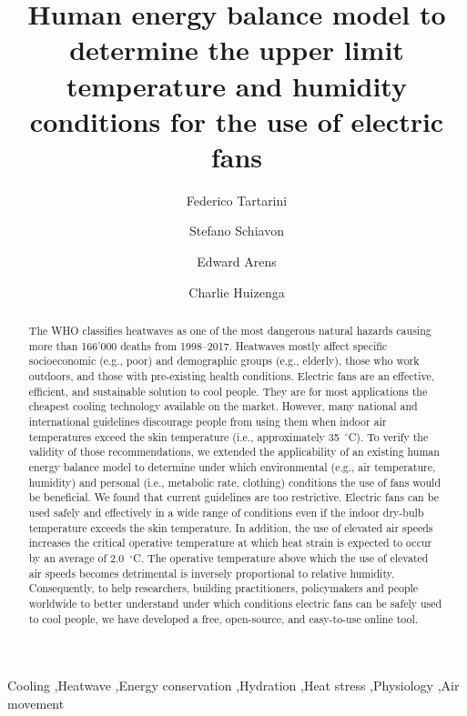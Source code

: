 
\begin{frontmatter}

\title{Human energy balance model to determine the upper limit temperature and humidity conditions for the use of electric fans}

\author[sinBerBest]{Federico Tartarini}
\author[CBE]{Stefano Schiavon}
\author[CBE]{Edward Arens}
\author[CBE]{Charlie Huizenga}

\address[sinBerBest]{SinBerBEST, Berkeley Education Alliance for Research in Singapore, Singapore}
\address[CBE]{Center for the Built Environment, University of California, Berkeley, USA}

\begin{abstract}
    The WHO classifies heatwaves as one of the most dangerous natural hazards causing more than 166'000 deaths from 1998--2017.
    Heatwaves mostly affect specific socioeconomic (e.g., poor) and demographic groups (e.g., elderly), those who work outdoors, and those with pre-existing health conditions.
    Electric fans are an effective, efficient, and sustainable solution to cool people.
    They are for most applications the cheapest cooling technology available on the market.
    However, many national and international guidelines discourage people from using them when indoor air temperatures exceed the skin temperature (i.e., approximately 35~$^{\circ}$C\@).
    To verify the validity of those recommendations, we extended the applicability of an existing human energy balance model to determine under which environmental (e.g., air temperature, humidity) and personal (i.e., metabolic rate, clothing) conditions the use of fans would be beneficial.
    We found that current guidelines are too restrictive.
    Electric fans can be used safely and effectively in a wide range of conditions even if the indoor dry-bulb temperature exceeds the skin temperature.
    In addition, the use of elevated air speeds increases the critical operative temperature at which heat strain is expected to occur by an average of 2.0~$^{\circ}$C\@.
    The operative temperature above which the use of elevated air speeds becomes detrimental is inversely proportional to relative humidity.
    Consequently, to help researchers, building practitioners, policymakers and people worldwide to better understand under which conditions electric fans can be safely used to cool people, we have developed a free, open-source, and easy-to-use online tool.
\end{abstract}

\begin{keyword}
Cooling \sep Heatwave \sep Energy conservation \sep Hydration \sep Heat stress \sep Physiology \sep Air movement
\end{keyword}

\end{frontmatter}
